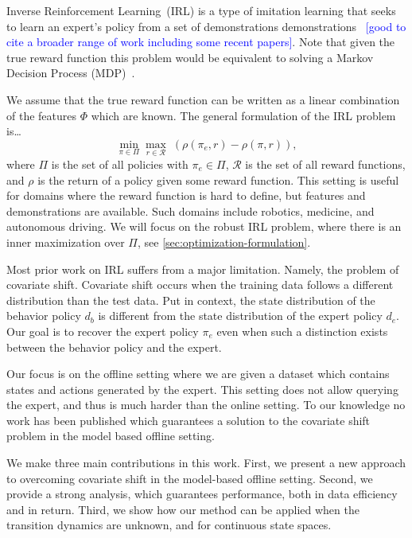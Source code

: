\documentclass[11pt]{article}
\newcommand{\mm}[1]{\textcolor{blue}{[#1]}}
\begin{document}
Inverse Reinforcement Learning~(IRL) is a type of imitation learning that seeks to learn an expert's policy from a set of demonstrations demonstrations~\cite{chang2021mitigating}
\mm{good to cite a broader range of work including some recent papers}.
Note that given the true reward function this problem would be equivalent to solving a Markov Decision Process (MDP)~\cite{Puterman1994}.

We assume that the true reward function can be written as a linear combination of the features $\Phi$ which are known.
The general formulation of the IRL problem is\dots
\begin{equation} \label{eq:IRL_formulation}
	\min_{\pi \in \Pi} \max_{r \in \mathcal{R}} \; (\rho(\pi_e, r) - \rho(\pi, r)),
\end{equation}
where $\Pi$ is the set of all policies with $\pi_e \in \Pi$, $\mathcal{R}$ is the set of all reward functions, and $\rho$ is the return of a policy given some reward function. This setting is useful for domains where the reward function is hard to define, but features and demonstrations are available. Such domains include robotics, medicine, and autonomous driving. We will focus on the robust IRL problem, where there is an inner maximization over $\Pi$, see \cref{sec:optimization-formulation}.

Most prior work on IRL suffers from a major limitation. Namely, the problem of covariate shift. Covariate shift occurs when the training data follows a different distribution than the test data. Put in context, the state distribution of the behavior policy $d_b$ is different from the state distribution of the expert policy $d_e$. Our goal is to recover the expert policy $\pi_e$ even when such a distinction exists between the behavior policy and the expert.

Our focus is on the offline setting where we are given a dataset which contains states and actions generated by the expert. This setting does not allow querying the expert, and thus is much harder than the online setting. To our knowledge no work has been published which guarantees a solution to the covariate shift problem in the model based offline setting.

We make three main contributions in this work. First, we present a new approach to overcoming covariate shift in the model-based offline setting. Second, we provide a strong analysis, which guarantees performance, both in data efficiency and in return. Third, we show how our method can be applied when the transition dynamics are unknown, and for continuous state spaces.
\end{document}
